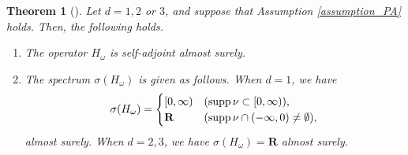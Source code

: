 \documentclass[12pt,a4paper]{article}
\newtheorem{theorem}{Theorem}[section]
\def\supp{\mathop{\rm supp}\nolimits}
\begin{document}
\begin{theorem}[\cite{Ka-Mi-Na}]
\label{theorem_kamina}
Let $d=1,2$ or $3$, and 
suppose that Assumption \ref{assumption_PA} holds.
Then, the following holds.

\begin{enumerate}
 \item[(1)] The operator $H_\omega$ is self-adjoint almost surely.
 \item[(2)]
The spectrum $\sigma(H_\omega)$ is given as follows.
When $d=1$, we have
\begin{align*}
 \sigma(H_\omega)=
\begin{cases}
 [0,\infty) & (\supp \nu \subset [0,\infty)),\\
 \mathbf{R} & (\supp\nu \cap (-\infty,0)\not=\emptyset),
\end{cases}
\end{align*}
almost surely.
When $d=2,3$, we have $ \sigma(H_\omega)=\mathbf{R}$ almost surely.
\end{enumerate}
\end{theorem}
\end{document}
